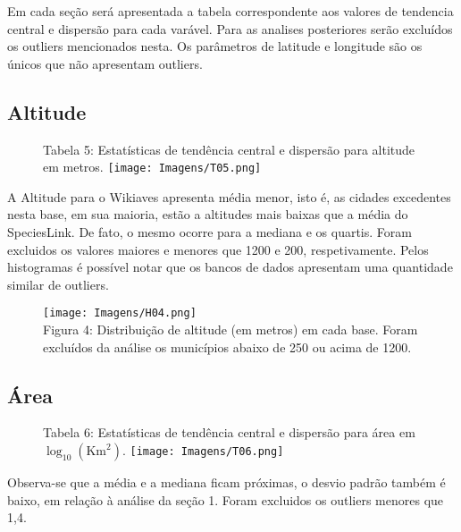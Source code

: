 \documentclass[12pt]{extarticle}
\newenvironment{resposta}{ \color{mygray}}{}
\begin{document}
\begin{resposta}
Em cada seção será apresentada a tabela correspondente aos valores de tendencia central e dispersão para cada varável. Para as analises posteriores serão excluídos os outliers mencionados nesta. Os parâmetros de latitude e longitude são os únicos que não apresentam outliers.
\end{resposta}


\subsection {Altitude}

\begin{figure}[h!]
\centering
{\scriptsize Tabela 5: Estatísticas de tendência central e dispersão para altitude em metros.}
\texttt{[image: Imagens/T05.png]}
\end{figure}


\begin{resposta}
A Altitude para o Wikiaves apresenta média menor, isto é, as cidades excedentes nesta base, em sua maioria, estão a altitudes mais baixas que a média do SpeciesLink. De fato, o mesmo ocorre para a mediana e os quartis. Foram excluidos os valores maiores e menores que 1200 e 200, respetivamente. Pelos histogramas é possível notar que os bancos de dados apresentam uma quantidade similar de outliers. 
\end{resposta}



\begin{figure}[h!]
\centering
\texttt{[image: Imagens/H04.png]}
\\{\scriptsize Figura 4: Distribuição de altitude (em metros) em cada base. Foram excluídos da análise os municípios abaixo de 250 ou acima de 1200.}
\end{figure}

\newpage

\subsection{Área}

\begin{figure}[h!]
\centering
{\scriptsize Tabela 6: Estatísticas de tendência central e dispersão para área em $\log_{10}(\text{Km}^2)$.}
\texttt{[image: Imagens/T06.png]}
\end{figure}

\begin{resposta}
Observa-se que a média e a mediana ficam próximas, o desvio padrão também é baixo, em relação à análise da seção 1. Foram excluidos os outliers menores que 1,4.
\end{resposta}
\end{document}
